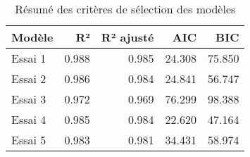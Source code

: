 \begin{table}
\caption{Résumé des critères de sélection des modèles}
\label{tab:regression_summary}
\begin{tabular}{lrrrr}
\toprule
Modèle & R² & R² ajusté & AIC & BIC \\
\midrule
Essai 1 & 0.988 & 0.985 & 24.308 & 75.850 \\
Essai 2 & 0.986 & 0.984 & 24.841 & 56.747 \\
Essai 3 & 0.972 & 0.969 & 76.299 & 98.388 \\
Essai 4 & 0.985 & 0.984 & 22.620 & 47.164 \\
Essai 5 & 0.983 & 0.981 & 34.431 & 58.974 \\
\bottomrule
\end{tabular}
\end{table}
